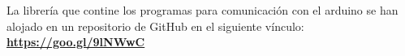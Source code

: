 La librería que contine los programas para comunicación con el arduino
se han alojado en un repositorio de GitHub en el siguiente vínculo:
\\
\hspace*{\fill}\href{https://goo.gl/9lNWwC}{\textbf{https://goo.gl/9lNWwC}}\hspace*{\fill}\\




    

    
